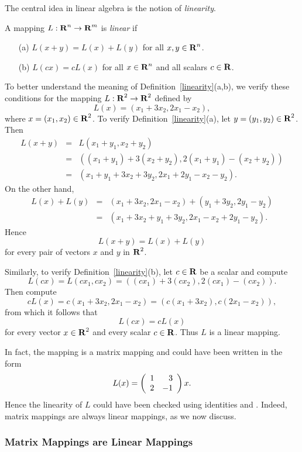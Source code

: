 The central idea in linear algebra is the notion of
{\em linearity\/}. 
\begin{Def} \label{linearity}
A mapping $L:\mbox{$\bf{R}$}^n\to\mbox{$\bf{R}$}^m$ is {\em linear}
if
\begin{itemize}
\item[(a)]  $L(x+y) = L(x) + L(y)$ for all $x,y\in\mbox{$\bf{R}$}^n$.
\item[(b)]  $L(cx) = cL(x)$ for all $x\in\mbox{$\bf{R}$}^n$ and all scalars
$c\in\mbox{$\bf{R}$}$.
\end{itemize}
\end{Def}

To better understand the meaning of Definition~\ref{linearity}(a,b),
we verify these conditions for the mapping $L:\mbox{$\bf{R}$}^2\to\mbox{$\bf{R}$}^2$ defined by
\begin{equation}  \label{E:mme}
L(x) = (x_1+3x_2,2x_1-x_2),
\end{equation}
where $x=(x_1,x_2)\in\mbox{$\bf{R}$}^2$.  To verify Definition~\ref{linearity}(a), let
$y=(y_1,y_2)\in\mbox{$\bf{R}$}^2$.  Then
\begin{eqnarray*}
L(x+y) & = & L(x_1+y_1,x_2+y_2)\\
& = & ((x_1+y_1)+3(x_2+y_2), 2(x_1+y_1)-(x_2+y_2)) \\
 & = & (x_1+y_1+3x_2+3y_2, 2x_1+2y_1-x_2-y_2).
\end{eqnarray*}
On the other hand,
\begin{eqnarray*}
L(x)+L(y) & = & (x_1+3x_2,2x_1-x_2) + (y_1+3y_2,2y_1-y_2) \\
 & = & (x_1+3x_2+y_1+3y_2, 2x_1-x_2+2y_1-y_2).
\end{eqnarray*}
Hence
\[
L(x+y) = L(x) + L(y)
\]
for every pair of vectors $x$ and $y $ in $\mbox{$\bf{R}$}^2$.

Similarly, to verify Definition~\ref{linearity}(b), let $c\in\mbox{$\bf{R}$}$ be a scalar
and compute
\[
L(cx) = L(cx_1,cx_2)=((cx_1)+3(cx_2),2(cx_1)-(cx_2)).
\]
Then compute
\[
cL(x) = c(x_1+3x_2,2x_1-x_2)= (c(x_1+3x_2), c(2x_1-x_2)),
\]
from which it follows that
\[
L(cx) = cL(x)
\]
for every vector $x\in\mbox{$\bf{R}$}^2$ and every scalar $c\in\mbox{$\bf{R}$}$.  Thus $L$ is a linear 
mapping.

In fact, the mapping  is a matrix mapping and could
have been written in the form
\[
L(x) = \left(\begin{array}{rr} 1 & 3\\ 2 &-1\end{array}\right)x.
\]
Hence the linearity of $L$ could have been checked using identities
 and .  Indeed, matrix mappings are always linear
mappings, as we now discuss.

\subsubsection*{Matrix Mappings are Linear Mappings}

